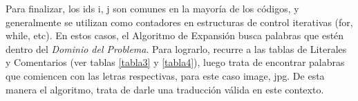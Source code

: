 Para finalizar, los ids  \textsf{i}, \textsf{j} son comunes en la mayoría de los códigos, y generalmente se utilizan como contadores en estructuras de control iterativas (\textsf{for}, \textsf{while}, etc). En estos casos, el Algoritmo de Expansión busca palabras que estén dentro del \textit{Dominio del Problema}. Para lograrlo, recurre a las tablas de Literales y Comentarios (ver tablas \ref{tabla3} y \ref{tabla4}), luego trata de encontrar palabras que comiencen con las letras respectivas, para este caso \textsf{image}, \textsf{jpg}. De esta manera el algoritmo, trata de darle una traducción válida en este contexto.




\begin{table}

		\centering
   		\begin{tabular}{| c | c | c | c | c |}     
   		

\end{tabular}
\end{table}
